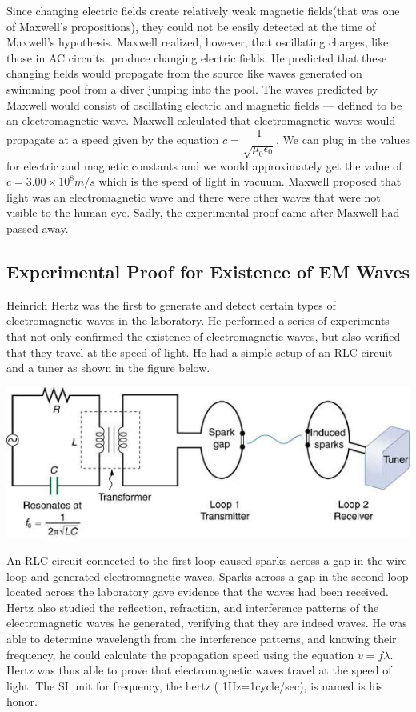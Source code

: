 \documentclass[11pt]{article}
\begin{document}
Since changing electric fields create relatively weak magnetic fields(that was one of Maxwell's propositions), they could not be easily detected at the time of Maxwell’s hypothesis. Maxwell realized, however, that oscillating charges, like those in AC circuits, produce changing electric fields. He predicted that these changing fields would propagate from the source like waves generated on swimming pool from a diver jumping into the pool. The waves predicted by Maxwell would consist of oscillating electric and magnetic fields — defined to be an electromagnetic wave. Maxwell calculated that electromagnetic waves would propagate at a speed given by the equation $c = \dfrac{1}{\sqrt{\mu_{0}\epsilon_{0}}}$. We can plug in the values for electric and magnetic constants and we would approximately get the value of $c=3.00\times10^8m/s$ which is the speed of light in vacuum. Maxwell proposed that light was an electromagnetic wave and there were other waves that were not visible to the human eye. Sadly, the experimental proof came after Maxwell had passed away.
\subsection*{Experimental Proof for Existence of EM Waves}
Heinrich Hertz was the first to generate and detect certain types of electromagnetic waves in the laboratory. He performed a series of experiments that not only confirmed the existence of electromagnetic waves, but also verified that they travel at the speed of light. He had a simple setup of an RLC circuit and a tuner as shown in the figure below.
\begin{center}
	\includegraphics[scale=0.6]{rlc}
\end{center}
An RLC circuit connected to the first loop caused sparks across a gap in the wire loop and generated electromagnetic waves. Sparks across a gap in the second loop located across the laboratory gave evidence that the waves had been received. Hertz also studied the reflection, refraction, and interference patterns of the electromagnetic waves he generated, verifying that they are indeed waves. He was able to determine wavelength from the interference patterns, and knowing their frequency, he could calculate the propagation speed using the equation $v=f\lambda$. Hertz was thus able to prove that electromagnetic waves travel at the speed of light. The SI unit for frequency, the hertz ( 1Hz=1cycle/sec), is named is his honor.
\end{document}
